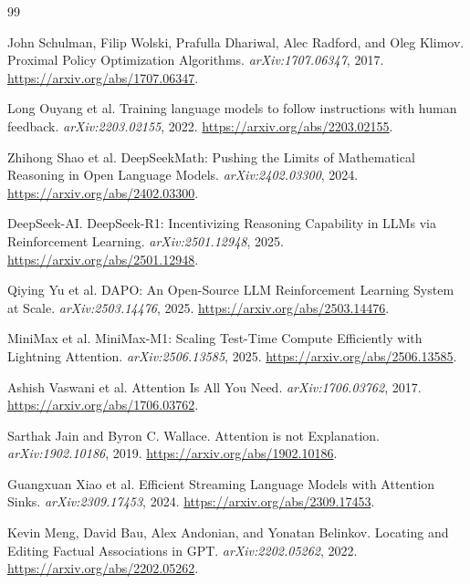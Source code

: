 \documentclass[11pt]{article}
\begin{document}
\begin{thebibliography}{99}

John Schulman, Filip Wolski, Prafulla Dhariwal, Alec Radford, and Oleg Klimov.
\newblock Proximal Policy Optimization Algorithms.
\newblock \emph{arXiv:1707.06347}, 2017.
\newblock \url{https://arxiv.org/abs/1707.06347}.

Long Ouyang et al.
\newblock Training language models to follow instructions with human feedback.
\newblock \emph{arXiv:2203.02155}, 2022.
\newblock \url{https://arxiv.org/abs/2203.02155}.

Zhihong Shao et al.
\newblock DeepSeekMath: Pushing the Limits of Mathematical Reasoning in Open
Language Models.
\newblock \emph{arXiv:2402.03300}, 2024.
\newblock \url{https://arxiv.org/abs/2402.03300}.

DeepSeek-AI.
\newblock DeepSeek-R1: Incentivizing Reasoning Capability in LLMs via
Reinforcement Learning.
\newblock \emph{arXiv:2501.12948}, 2025.
\newblock \url{https://arxiv.org/abs/2501.12948}.

Qiying Yu et al.
\newblock DAPO: An Open-Source LLM Reinforcement Learning System at Scale.
\newblock \emph{arXiv:2503.14476}, 2025.
\newblock \url{https://arxiv.org/abs/2503.14476}.

MiniMax et al.
\newblock MiniMax-M1: Scaling Test-Time Compute Efficiently with Lightning
Attention.
\newblock \emph{arXiv:2506.13585}, 2025.
\newblock \url{https://arxiv.org/abs/2506.13585}.

Ashish Vaswani et al.
\newblock Attention Is All You Need.
\newblock \emph{arXiv:1706.03762}, 2017.
\newblock \url{https://arxiv.org/abs/1706.03762}.

Sarthak Jain and Byron C. Wallace.
\newblock Attention is not Explanation.
\newblock \emph{arXiv:1902.10186}, 2019.
\newblock \url{https://arxiv.org/abs/1902.10186}.

Guangxuan Xiao et al.
\newblock Efficient Streaming Language Models with Attention Sinks.
\newblock \emph{arXiv:2309.17453}, 2024.
\newblock \url{https://arxiv.org/abs/2309.17453}.

Kevin Meng, David Bau, Alex Andonian, and Yonatan Belinkov.
\newblock Locating and Editing Factual Associations in GPT.
\newblock \emph{arXiv:2202.05262}, 2022.
\newblock \url{https://arxiv.org/abs/2202.05262}.


\end{thebibliography}
\end{document}
